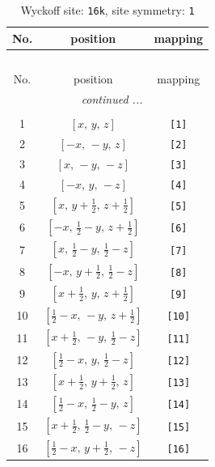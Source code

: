 \documentclass[fleqn,8pt]{jsarticle}
\begin{document}
\begin{longtable}{ccc}
\caption{Wyckoff site: {\tt 16k}, site symmetry: {\tt 1}}
 \\
 \hline \hline
No. & position & mapping \\ \hline \endfirsthead

\multicolumn{2}{l}{\tablename\ \thetable{}} \\
 \hline \hline
No. & position & mapping \\ \hline \endhead

 \hline \hline
\multicolumn{2}{r}{\footnotesize\it continued ...} \\ \endfoot

 \hline \hline
\multicolumn{2}{r}{} \\ \endlastfoot

1 & $\left[ x,\, y,\, z \right]$ & {\tt [1]} \\ \hline
2 & $\left[ - x,\, - y,\, z \right]$ & {\tt [2]} \\ \hline
3 & $\left[ x,\, - y,\, - z \right]$ & {\tt [3]} \\ \hline
4 & $\left[ - x,\, y,\, - z \right]$ & {\tt [4]} \\ \hline
5 & $\left[ x,\, y + \frac{1}{2},\, z + \frac{1}{2} \right]$ & {\tt [5]} \\ \hline
6 & $\left[ - x,\, \frac{1}{2} - y,\, z + \frac{1}{2} \right]$ & {\tt [6]} \\ \hline
7 & $\left[ x,\, \frac{1}{2} - y,\, \frac{1}{2} - z \right]$ & {\tt [7]} \\ \hline
8 & $\left[ - x,\, y + \frac{1}{2},\, \frac{1}{2} - z \right]$ & {\tt [8]} \\ \hline
9 & $\left[ x + \frac{1}{2},\, y,\, z + \frac{1}{2} \right]$ & {\tt [9]} \\ \hline
10 & $\left[ \frac{1}{2} - x,\, - y,\, z + \frac{1}{2} \right]$ & {\tt [10]} \\ \hline
11 & $\left[ x + \frac{1}{2},\, - y,\, \frac{1}{2} - z \right]$ & {\tt [11]} \\ \hline
12 & $\left[ \frac{1}{2} - x,\, y,\, \frac{1}{2} - z \right]$ & {\tt [12]} \\ \hline
13 & $\left[ x + \frac{1}{2},\, y + \frac{1}{2},\, z \right]$ & {\tt [13]} \\ \hline
14 & $\left[ \frac{1}{2} - x,\, \frac{1}{2} - y,\, z \right]$ & {\tt [14]} \\ \hline
15 & $\left[ x + \frac{1}{2},\, \frac{1}{2} - y,\, - z \right]$ & {\tt [15]} \\ \hline
16 & $\left[ \frac{1}{2} - x,\, y + \frac{1}{2},\, - z \right]$ & {\tt [16]} \\
\end{longtable}
\end{document}
